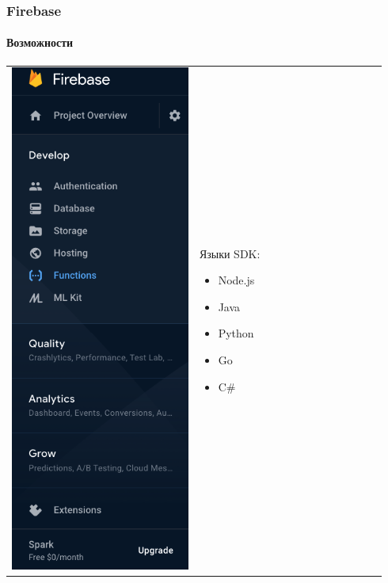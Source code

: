 \documentclass{beamer}
\begin{document}
    \begin{frame}
        \frametitle{Firebase}
        \framesubtitle{Возможности}
        \vspace*{0.2cm}
        \begin{tabular}{m{0.47\linewidth}m{0.47\linewidth}}
            \centering
            \includegraphics[width=0.5\linewidth]{images/FirebaseInterface}
            &
            Языки SDK:
            \begin{itemize}
                \item Node.js
                \item Java
                \item Python
                \item Go
                \item C\#
            \end{itemize}
 		\end{tabular}
    \end{frame}
\end{document}
